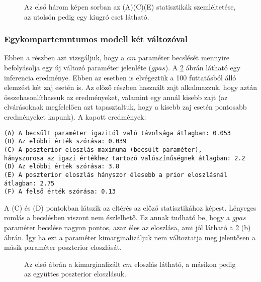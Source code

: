 \begin{figure}
	\hfill
	\hfill
	\hfill
	\vfill
	\hfill
	\caption[Egykompartmentum, fehér zaj, egy paraméter statisztika]{Az első három képen sorban az (A)(C)(E) statisztikák szemléltetése, az utolsón pedig egy kiugró eset látható.}%
	\label{fig:wn1-stat}
\end{figure}



\FloatBarrier
\subsubsection{Egykompartemntumos modell két változóval}
Ebben a részben azt vizsgáljuk, hogy a $cm$ paraméter becslését mennyire befolyásolja egy új változó paraméter jelenléte ($gpas$).
A \ref{fig:wn2} ábrán látható egy inferencia eredménye. Ebben az esetben is elvégeztük a 100 futtatásból álló elemzést két zaj esetén is. Az előző részben használt zajt alkalmazzuk, hogy aztán összehasonlíthassuk az eredményeket, valamint egy annál kisebb zajt (az elvárásoknak megfelelően azt tapasztaltuk, hogy a kisebb zaj esetén pontosabb eredményeket kapunk). A kapott eredmények:
\begin{verbatim}
(A) A becsült paraméter igazitól való távolsága átlagban: 0.053
(B) Az előbbi érték szórása: 0.039
(C) A poszterior eloszlás maximuma (becsült paraméter), 
hányszorosa az igazi értékhez tartozó valószínűségnek átlagban: 2.2
(D) Az előbbi érték szórása: 3.8
(E) A poszterior eloszlás hányszor élesebb a prior eloszlásnál átlagban: 2.75
(F) A felső érték szórása: 0.13
\end{verbatim}
A (C) és (D) pontokban látszik az eltérés az előző statisztikához képest. Lényeges romlás a becslésben viszont nem észlelhető. Ez annak tudható be, hogy a $gpas$ paraméter becslése nagyon pontos, azaz éles az eloszlása, ami jól látható a \ref{fig:wn2} (b) ábrán. Így ha ezt a paraméter kimarginalizáljuk nem változtatja meg jelentősen a másik paraméter poszterior eloszlását.

\begin{figure}
	\hfill
	\hfill
	\hfill
	\caption[Egykompartmentumos, fehér zaj, két paraméteres becslés]{Az első ábrán a kimarginalizált $cm$ eloszlás látható, a másikon pedig az együttes poszterior eloszlásuk. }%
	\label{fig:wn2}
\end{figure}

